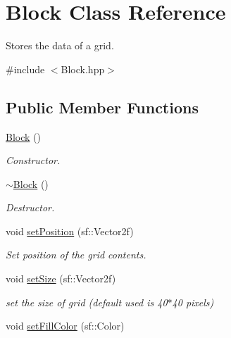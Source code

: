 \hypertarget{class_block}{\section{Block Class Reference}
\label{class_block}
}


Stores the data of a grid.  




{\ttfamily \#include $<$Block.\+hpp$>$}

\subsection*{Public Member Functions}
\begin{DoxyCompactItemize}
\item 
\hypertarget{class_block_a37658a946bf5067ad01d68d9ff086adc}{\hyperlink{class_block_a37658a946bf5067ad01d68d9ff086adc}{Block} ()}\label{class_block_a37658a946bf5067ad01d68d9ff086adc}

\begin{DoxyCompactList}\small\item\em Constructor. \end{DoxyCompactList}\item 
\hypertarget{class_block_a19d1bd0e1cef6a865ed2745a2e648405}{\hyperlink{class_block_a19d1bd0e1cef6a865ed2745a2e648405}{$\sim$\+Block} ()}\label{class_block_a19d1bd0e1cef6a865ed2745a2e648405}

\begin{DoxyCompactList}\small\item\em Destructor. \end{DoxyCompactList}\item 
\hypertarget{class_block_a0208720bae86cf8a480ca94a30ecbd51}{void \hyperlink{class_block_a0208720bae86cf8a480ca94a30ecbd51}{set\+Position} (sf\+::\+Vector2f)}\label{class_block_a0208720bae86cf8a480ca94a30ecbd51}

\begin{DoxyCompactList}\small\item\em Set position of the grid contents. \end{DoxyCompactList}\item 
\hypertarget{class_block_a3f4e2f49dddf4edff90c229b25e70cfc}{void \hyperlink{class_block_a3f4e2f49dddf4edff90c229b25e70cfc}{set\+Size} (sf\+::\+Vector2f)}\label{class_block_a3f4e2f49dddf4edff90c229b25e70cfc}

\begin{DoxyCompactList}\small\item\em set the size of grid (default used is 40$\ast$40 pixels) \end{DoxyCompactList}\item 
\hypertarget{class_block_aa0340defd5cbf7ba39c1e41be981a947}{void \hyperlink{class_block_aa0340defd5cbf7ba39c1e41be981a947}{set\+Fill\+Color} (sf\+::\+Color)}\label{class_block_aa0340defd5cbf7ba39c1e41be981a947}


\end{DoxyCompactItemize}
